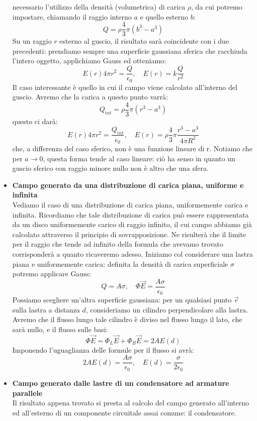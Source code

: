 \documentclass[a4paper,12pt]{article}
\begin{document}
\begin{itemize}
necessario l'utilizzo della densità (volumetrica) di carica $\rho$, da cui potremo impostare, chiamando il raggio interno $a$ e quello esterno $b$:
$$ Q = \rho \frac{4}{3}\pi(b^3 - a^3) $$
Su un raggio $r$ esterno al guscio, il risultato sarà coincidente con i due precedenti: prendiamo sempre una superficie gaussiana sferica che racchiuda
l'intero oggetto, applichiamo Gauss ed otteniamo:
$$ E(r)4\pi r^2 = \frac{Q}{\epsilon_0}, \quad E(r) = k\frac{Q}{r^2} $$
Il caso interessante è quello in cui il campo viene calcolato all'interno del guscio. Avremo che la carica a questo punto varrà:
$$ Q_{int} = \rho \frac{4}{3} \pi (r^3-a^3)$$
questo ci darà:
$$ E(r)4 \pi r^2 = \frac{Q_{int}}{\epsilon_0}, \quad E(r) = \rho \frac{4}{3} \pi \frac{r^3-a^3}{4\pi R^2} $$
che, a differenza del caso sferico, non è una funzione lineare di r. Notiamo che per $a\rightarrow 0$,
questa forma tende al caso lineare: ciò ha senso in quanto un guscio sferico con raggio minore nullo non è altro che
una sfera.
\item \textbf{Campo generato da una distribuzione di carica piana, uniforme e infinita} \\
Vediamo il caso di una distribuzione di carica piana, uniformemente carica e infinita. Ricordiamo che tale distribuzione di carica può essere rappresentata
da un disco uniformemente carico di raggio infinito, il cui campo abbiamo già calcolato attraverso il principio di sovrapposizione. Ne risulterà che il limite per il raggio
che tende ad infinito della formula che avevamo trovato corrisponderà a quanto ricaveremo adesso.
Iniziamo col considerare una lastra piana e uniformemente carica: definita la densità di carica superficiale $\sigma$ potremo applicare Gauss:
$$ Q = A\sigma, \quad \Phi{\vec{E}} = \frac{A\sigma}{\epsilon_0} $$
Possiamo scegliere un'altra superficie gaussiana: per un qualsiasi punto $\vec{r}$ sulla lastra a distanza $d$, consideriamo un cilindro perpendicolare alla lastra.
Avremo che il flusso lungo tale cilindro è diviso nel flusso lungo il lato, che sarà nullo, e il flusso sulle basi:
$$ \Phi{\vec{E}} = \Phi_L{\vec{E}} + \Phi_B{\vec{E}} = 2AE(d) $$
Imponendo l'uguaglianza delle formule per il flusso si avrà:
$$ 2AE(d) = \frac{A\sigma}{\epsilon_0}, \quad E(d) = \frac{\sigma}{2\epsilon_0} $$
\item \textbf{Campo generato dalle lastre di un condensatore ad armature parallele} \\
Il risultato appena trovato si presta al calcolo del campo generato all'interno ed all'esterno di un componente circuitale assai comune: il condensatore.

\end{itemize}
\end{document}
